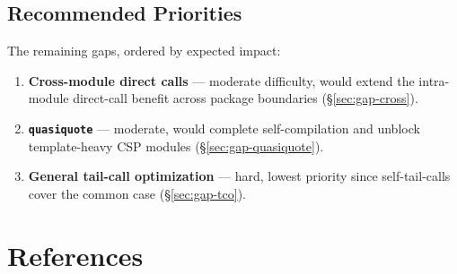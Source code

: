 \documentclass[12pt]{report}
\begin{document}
\section{Recommended Priorities}
\label{sec:gaps-priorities}

The remaining gaps, ordered by expected impact:

\begin{enumerate}
\item \textbf{Cross-module direct calls} --- moderate difficulty,
  would extend the intra-module direct-call benefit across package
  boundaries (\S\ref{sec:gap-cross}).

\item \textbf{\texttt{quasiquote}} --- moderate, would complete
  self-compilation and unblock template-heavy CSP modules
  (\S\ref{sec:gap-quasiquote}).

\item \textbf{General tail-call optimization} --- hard, lowest
  priority since self-tail-calls cover the common case
  (\S\ref{sec:gap-tco}).
\end{enumerate}

\chapter*{References}
\end{document}
